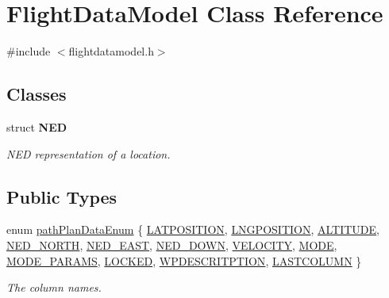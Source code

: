 \hypertarget{class_flight_data_model}{\section{\-Flight\-Data\-Model \-Class \-Reference}
\label{class_flight_data_model}
}


{\ttfamily \#include $<$flightdatamodel.\-h$>$}

\subsection*{\-Classes}
\begin{DoxyCompactItemize}
\item 
struct {\bfseries \-N\-E\-D}
\begin{DoxyCompactList}\small\item\em \-N\-E\-D representation of a location. \end{DoxyCompactList}\end{DoxyCompactItemize}
\subsection*{\-Public \-Types}
\begin{DoxyCompactItemize}
\item 
enum \hyperlink{group___path_gaa0908516cbd02b164b605fce903d9066}{path\-Plan\-Data\-Enum} \{ \*
\hyperlink{group___path_ggaa0908516cbd02b164b605fce903d9066a13024b57ed66f819f1bd7a7be0e11547}{\-L\-A\-T\-P\-O\-S\-I\-T\-I\-O\-N}, 
\hyperlink{group___path_ggaa0908516cbd02b164b605fce903d9066a62e4abf60e84ec15a1d55ccead4a171d}{\-L\-N\-G\-P\-O\-S\-I\-T\-I\-O\-N}, 
\hyperlink{group___path_ggaa0908516cbd02b164b605fce903d9066a6cb875c2764969992994d66ba514a189}{\-A\-L\-T\-I\-T\-U\-D\-E}, 
\hyperlink{group___path_ggaa0908516cbd02b164b605fce903d9066a17bce9ec0e6fab7e3abc296781e3acbe}{\-N\-E\-D\-\_\-\-N\-O\-R\-T\-H}, 
\*
\hyperlink{group___path_ggaa0908516cbd02b164b605fce903d9066ac273ffece3fb399e96824a7c940fbb66}{\-N\-E\-D\-\_\-\-E\-A\-S\-T}, 
\hyperlink{group___path_ggaa0908516cbd02b164b605fce903d9066a8132be414bfac5bfc9a86e3fa3c2c4c2}{\-N\-E\-D\-\_\-\-D\-O\-W\-N}, 
\hyperlink{group___path_ggaa0908516cbd02b164b605fce903d9066a1893f60afdc05d0fc0c762e8f74f6b89}{\-V\-E\-L\-O\-C\-I\-T\-Y}, 
\hyperlink{group___path_ggaa0908516cbd02b164b605fce903d9066abc9a6ccea3fe42c5fb3b77401f59e3e0}{\-M\-O\-D\-E}, 
\*
\hyperlink{group___path_ggaa0908516cbd02b164b605fce903d9066a8c8d56fc223af4d252e65152fbf61c5f}{\-M\-O\-D\-E\-\_\-\-P\-A\-R\-A\-M\-S}, 
\hyperlink{group___path_ggaa0908516cbd02b164b605fce903d9066acf92b5f5aa8947d83f18ff9d9dbb1681}{\-L\-O\-C\-K\-E\-D}, 
\hyperlink{group___path_ggaa0908516cbd02b164b605fce903d9066a87ddbd86791c5f58af0900f25ea3e0a7}{\-W\-P\-D\-E\-S\-C\-R\-I\-T\-P\-T\-I\-O\-N}, 
\hyperlink{group___path_ggaa0908516cbd02b164b605fce903d9066a9a93aeb591b9c29b835458cbbfc825c5}{\-L\-A\-S\-T\-C\-O\-L\-U\-M\-N}
 \}
\begin{DoxyCompactList}\small\item\em \-The column names. \end{DoxyCompactList}\end{DoxyCompactItemize}
